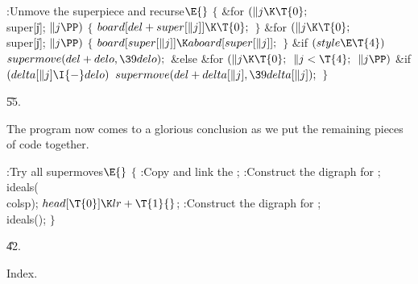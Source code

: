\Y\B\4:Unmove the superpiece and recurse\X${}\E{}$\6
${}\{{}$\1\6
\&{for} ${}(\|j\K\T{0};{}$ \\{super}[\|j]; ${}\|j\PP){}$\5
${}\{{}$\1\6
${}\\{board}[\\{del}+\\{super}[\|j]]\K\T{0};{}$\6
\4${}\}{}$\2\6
\&{for} ${}(\|j\K\T{0};{}$ \\{super}[\|j]; ${}\|j\PP){}$\5
${}\{{}$\1\6
${}\\{board}[\\{super}[\|j]]\K\\{aboard}[\\{super}[\|j]];{}$\6
\4${}\}{}$\2\6
\&{if} ${}(\\{style}\E\T{4}){}$\1\5
${}\\{supermove}(\\{del}+\\{delo},\39\\{delo});{}$\2\6
\&{else}\1\6
\&{for} ${}(\|j\K\T{0};{}$ ${}\|j<\T{4};{}$ ${}\|j\PP){}$\1\6
\&{if} ${}(\\{delta}[\|j]\I{-}\\{delo}){}$\1\5
${}\\{supermove}(\\{del}+\\{delta}[\|j],\39\\{delta}[\|j]);{}$\2\2\2\6
\4${}\}{}$\2\par
\U55.\fi

The program now comes to a glorious conclusion as we put
the remaining
pieces of code together.

\Y\B\4:Try all supermoves\X${}\E{}$\6
${}\{{}$\1\6
:Copy and link the \X;\6
:Construct the digraph for \X;\6
\\{ideals}(\\{colsp});\6
${}\\{head}[\T{0}]\K\\{lr}+\T{1}{}$;\6
:Construct the digraph for \X;\6
\\{ideals}();\6
\4${}\}{}$\2\par
\U42.\fi

Index.
\fi

\inx
\fin
\con
